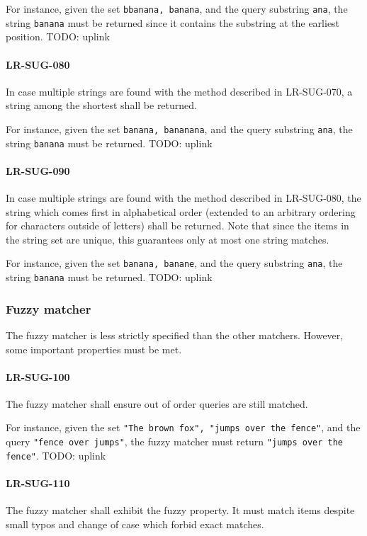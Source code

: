 For instance, given the set \lstinline{bbanana, banana}, and the
query substring \lstinline{ana}, the string \lstinline{banana}
must be returned since it contains the substring at the earliest
position.
TODO: uplink

\paragraph{LR-SUG-080}
In case multiple strings are found with the method described
in LR-SUG-070, a string among the shortest shall be returned.

For instance, given the set \lstinline{banana, bananana}, and
the query substring \lstinline{ana}, the string \lstinline{banana}
must be returned.
TODO: uplink

\paragraph{LR-SUG-090}
In case multiple strings are found with the method described
in LR-SUG-080, the string which comes first in alphabetical order
(extended to an arbitrary ordering for characters outside of letters)
shall be returned. Note that since the items in the string set are unique,
this guarantees only at most one string matches.

For instance, given the set \lstinline{banana, banane}, and the query
substring \lstinline{ana}, the string \lstinline{banana} must be
returned.
TODO: uplink

\subsubsection{Fuzzy matcher}
The fuzzy matcher is less strictly specified than the other matchers. However,
some important properties must be met.

\paragraph{LR-SUG-100}
The fuzzy matcher shall ensure out of order queries are still matched.

For instance, given the set \lstinline{"The brown fox", "jumps over the fence"},
and the query \lstinline{"fence over jumps"}, the fuzzy matcher must
return \lstinline{"jumps over the fence"}.
TODO: uplink

\paragraph{LR-SUG-110}
The fuzzy matcher shall exhibit the fuzzy property. It must match
items despite small typos and change of case
which forbid exact matches.

